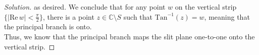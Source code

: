 \documentclass[11pt]{article}
\newcommand{\C}{\mathbb{C}}
\newenvironment{solution}
  {\renewcommand\qedsymbol{$\blacksquare$}\begin{proof}[Solution]}
  {\end{proof}}
\theoremstyle{definition}
\begin{document}
\begin{enumerate}[a)]
\begin{solution}
as desired. We conclude that for any point $w$ on the vertical strip $\{ | \mathrm{Re} \, w | < \frac{\pi}{2}\}$, there is a point $z \in \C \setminus S$ such that $\mathrm{Tan}^{-1}(z) = w$, meaning that the principal branch is onto. \\

Thus, we know that the principal branch maps the slit plane one-to-one onto the vertical strip. 
\end{solution}


\end{enumerate}
\end{document}

